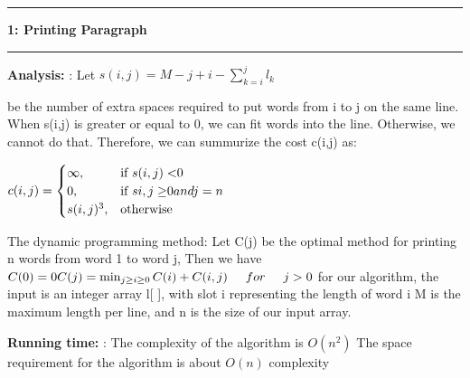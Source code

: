 \documentclass[11pt]{article}
\newcommand\question[2]{\vspace{.25in}\hrule\textbf{#1: #2}\vspace{.5em}\hrule\vspace{.10in}}
\newcommand\analysis{\vspace{.10in}\textbf{Analysis: }}
\newcommand\runtime{\vspace{.10in}\textbf{Running time: }}
\begin{document}
\raggedright
\newcommand\NAME{Zeyuan Xu}  %
\newcommand\ANDREWID{004255573}     %
\newcommand\HWNUM{5}              %


\question{1}{Printing Paragraph} 

\analysis:
Let
\begin{math}
s(i,j) = M - j + i - \displaystyle\sum_{k=i}^{j} l_k
\end{math}

be the number of extra spaces required to put words from i to j on the same line. 
When s(i,j) is greater or equal to 0, we can fit words into the line. Otherwise, we cannot do that.
Therefore, we can summurize the cost c(i,j) as:

\begin{math} 
c(i,j)=
\begin{cases}
\infty, & \text{if}\ s(i,j) < $0$ \\
0, & \text{if}\ s{i,j} \geq $0$ and j = n \\
s(i,j)^3, & \text{otherwise} 
\end{cases}
\end{math}

The dynamic programming method:
Let C(j) be the optimal method for printing n words from word 1 to word j,  Then we have \newline
\begin{math}
C(0) = 0  \newline
C(j) = \min_{j \geq i \geq 0} C(i)+ C(i,j)    \hspace{5mm} for  \hspace{5mm} j > 0 
\end{math}\newline 
for our algorithm, the input is an integer array l[ ], with  slot i representing the length of word i
M is the maximum length per line, and n is the size of our input array.

\runtime:
The complexity of the algorithm is $O(n^2)$
The space requirement for the algorithm is about $O(n)$ complexity 
\end{document}
